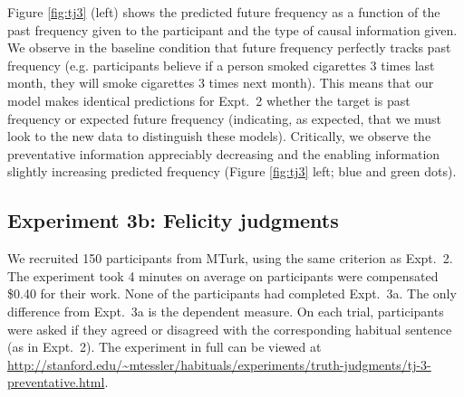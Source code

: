 \documentclass[10pt,letterpaper]{article}
\begin{document}
Figure \ref{fig:tj3} (left) shows the predicted future frequency as a function of the past frequency given to the participant and the type of causal information given. 
We observe in the baseline condition that future frequency perfectly tracks past frequency (e.g. participants believe if a person smoked cigarettes 3 times last month, they will smoke cigarettes 3 times next month). 
This means that our model makes identical predictions for Expt.~2 whether the target is past frequency or expected future frequency (indicating, as expected, that we must look to the new data to distinguish these models).
Critically, we observe the preventative information appreciably decreasing and the enabling information slightly increasing predicted frequency (Figure \ref{fig:tj3} left; blue and green dots).




\subsection{Experiment 3b: Felicity judgments}



We recruited 150 participants from MTurk, using the same criterion as Expt.~2.
The experiment took 4 minutes on average on participants were compensated \$0.40 for their work.
None of the participants had completed Expt.~3a.
The only difference from Expt.~3a is the dependent measure. 
On each trial, participants were asked if they agreed or disagreed with the corresponding habitual sentence (as in Expt.~2).
The experiment in full can be viewed at \url{http://stanford.edu/~mtessler/habituals/experiments/truth-judgments/tj-3-preventative.html}.
\end{document}

